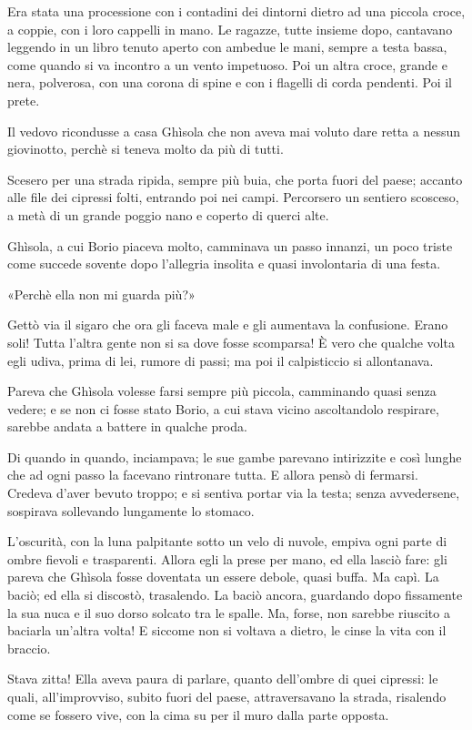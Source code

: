 Era stata una processione con i contadini dei dintorni dietro ad una piccola croce, a coppie, con i loro cappelli in mano. Le ragazze, tutte insieme dopo, cantavano leggendo in un libro tenuto aperto con ambedue le mani, sempre a testa bassa, come quando si va incontro a un vento impetuoso. Poi un altra croce, grande e nera, polverosa, con una corona di spine e con i flagelli di corda pendenti. Poi il prete.

Il vedovo ricondusse a casa Ghìsola che non aveva mai voluto dare retta a nessun giovinotto, perchè si teneva molto da più di tutti.

Scesero per una strada ripida, sempre più buia, che porta fuori del paese; accanto alle file dei cipressi folti, entrando poi nei campi. Percorsero un sentiero scosceso, a metà di un grande poggio nano e coperto di querci alte.

Ghìsola, a cui Borio piaceva molto, camminava un passo innanzi, un poco triste come succede sovente dopo l'allegria insolita e quasi involontaria di una festa.

«Perchè ella non mi guarda più?»

Gettò via il sigaro che ora gli faceva male e gli aumentava la confusione. Erano soli! Tutta l'altra gente non si sa dove fosse scomparsa! È vero che qualche volta egli udiva, prima di lei, rumore di passi; ma poi il calpisticcio si allontanava.

Pareva che Ghìsola volesse farsi sempre più piccola, camminando quasi senza vedere; e se non ci fosse stato Borio, a cui stava vicino ascoltandolo respirare, sarebbe andata a battere in qualche proda.

Di quando in quando, inciampava; le sue gambe parevano intirizzite e così lunghe che ad ogni passo la facevano rintronare tutta. E allora pensò di fermarsi. Credeva d'aver bevuto troppo; e si sentiva portar via la testa; senza avvedersene, sospirava sollevando lungamente lo stomaco.

L'oscurità, con la luna palpitante sotto un velo di nuvole, empiva ogni parte di ombre fievoli e trasparenti. Allora egli la prese per mano, ed ella lasciò fare: gli pareva che Ghìsola fosse doventata un essere debole, quasi buffa. Ma capì. La baciò; ed ella si discostò, trasalendo. La baciò ancora, guardando dopo fissamente la sua nuca e il suo dorso solcato tra le spalle. Ma, forse, non sarebbe riuscito a baciarla un'altra volta! E siccome non si voltava a dietro, le cinse la vita con il braccio.

Stava zitta! Ella aveva paura di parlare, quanto dell'ombre di quei cipressi: le quali, all'improvviso, subito fuori del paese, attraversavano la strada, risalendo come se fossero vive, con la cima su per il muro dalla parte opposta.

